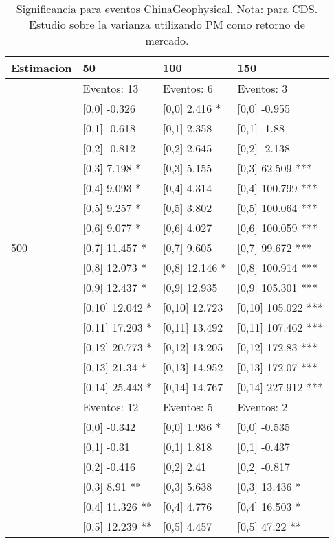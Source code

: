 \begin{table}

\caption{Significancia para eventos ChinaGeophysical. Nota: para CDS. Estudio sobre la varianza utilizando PM como retorno de mercado.}
\centering
\begin{tabular}[t]{llll}
\toprule
Estimacion & 50 & 100 & 150\\
\midrule
 & Eventos:  13 & Eventos:  6 & Eventos:  3\\
 & {}[0,0] -0.326 & {}[0,0] 2.416 * & {}[0,0] -0.955\\
 & {}[0,1] -0.618 & {}[0,1] 2.358 & {}[0,1] -1.88\\
 & {}[0,2] -0.812 & {}[0,2] 2.645 & {}[0,2] -2.138\\
 & {}[0,3] 7.198 * & {}[0,3] 5.155 & {}[0,3] 62.509 ***\\
\addlinespace
 & {}[0,4] 9.093 * & {}[0,4] 4.314 & {}[0,4] 100.799 ***\\
 & {}[0,5] 9.257 * & {}[0,5] 3.802 & {}[0,5] 100.064 ***\\
 & {}[0,6] 9.077 * & {}[0,6] 4.027 & {}[0,6] 100.059 ***\\
500 & {}[0,7] 11.457 * & {}[0,7] 9.605 & {}[0,7] 99.672 ***\\
 & {}[0,8] 12.073 * & {}[0,8] 12.146 * & {}[0,8] 100.914 ***\\
\addlinespace
 & {}[0,9] 12.437 * & {}[0,9] 12.935 & {}[0,9] 105.301 ***\\
 & {}[0,10] 12.042 * & {}[0,10] 12.723 & {}[0,10] 105.022 ***\\
 & {}[0,11] 17.203 * & {}[0,11] 13.492 & {}[0,11] 107.462 ***\\
 & {}[0,12] 20.773 * & {}[0,12] 13.205 & {}[0,12] 172.83 ***\\
 & {}[0,13] 21.34 * & {}[0,13] 14.952 & {}[0,13] 172.07 ***\\
\addlinespace
 & {}[0,14] 25.443 * & {}[0,14] 14.767 & {}[0,14] 227.912 ***\\
 & Eventos:  12 & Eventos:  5 & Eventos:  2\\
 & {}[0,0] -0.342 & {}[0,0] 1.936 * & {}[0,0] -0.535\\
 & {}[0,1] -0.31 & {}[0,1] 1.818 & {}[0,1] -0.437\\
 & {}[0,2] -0.416 & {}[0,2] 2.41 & {}[0,2] -0.817\\
\addlinespace
 & {}[0,3] 8.91 ** & {}[0,3] 5.638 & {}[0,3] 13.436 *\\
 & {}[0,4] 11.326 ** & {}[0,4] 4.776 & {}[0,4] 16.503 *\\
 & {}[0,5] 12.239 ** & {}[0,5] 4.457 & {}[0,5] 47.22 **\\

\end{tabular}
\end{table}
